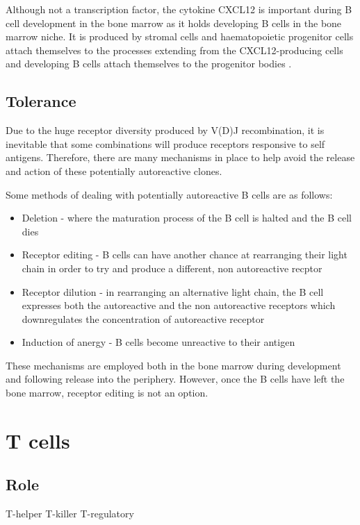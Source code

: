 Although not a transcription factor, the cytokine CXCL12 is important during B cell development in the bone marrow as it holds developing B cells in the bone marrow niche.
It is produced by stromal cells and haematopoietic progenitor cells attach themselves to the processes extending from the CXCL12-producing cells and developing B cells attach themselves to the progenitor bodies \citep{Tokoyoda2004}.

\subsection{Tolerance}

Due to the huge receptor diversity produced by V(D)J recombination, it is inevitable that some combinations will produce receptors responsive to self antigens.
Therefore, there are many mechanisms in place to help avoid the release and action of these potentially autoreactive clones.

Some methods of dealing with potentially autoreactive B cells are as follows:
\begin{itemize}
\item Deletion - where the maturation process of the B cell is halted and the B cell dies \citep{Cornall1995}
\item Receptor editing - B cells can have another chance at rearranging their light chain in order to try and produce a different, non autoreactive recptor \citep{Orduno2009, Gay1993}
\item Receptor dilution - in rearranging an alternative light chain, the B cell expresses both the autoreactive and the non autoreactive receptors which downregulates the concentration of autoreactive receptor \citep{Gay1993, Orduno2009}
\item Induction of anergy - B cells become unreactive to their antigen \citep{Orduno2009}
\end{itemize}

These mechanisms are employed both in the bone marrow during development and following release into the periphery.
However, once the B cells have left the bone marrow, receptor editing is not an option.



\section{T cells}
\subsection{Role}
T-helper
T-killer
T-regulatory

